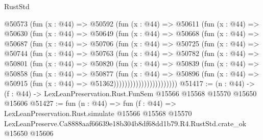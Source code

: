 \begin{lexlean}{RustStd}
\begin{coremodule}
          @50573
            (fun (x : @44) =>
            @50592
              (fun (x : @44) =>
              @50611
                (fun (x : @44) =>
                @50630
                  (fun (x : @44) =>
                  @50649
                    (fun (x : @44) =>
                    @50668
                      (fun (x : @44) =>
                      @50687
                        (fun (x : @44) =>
                        @50706
                          (fun (x : @44) =>
                          @50725
                            (fun (x : @44) =>
                            @50744
                              (fun (x : @44) =>
                              @50763
                                (fun (x : @44) =>
                                @50782
                                  (fun (x : @44) =>
                                  @50801
                                    (fun (x : @44) =>
                                    @50820
                                      (fun (x : @44) =>
                                      @50839
                                        (fun (x : @44) =>
                                        @50858
                                          (fun (x : @44) =>
                                          @50877
                                            (fun (x : @44) =>
                                            @50896
                                              (fun (x : @44) =>
                                              @50915 (fun (x : @44) => @51362)))))))))))))))))))))))
@51417 := (n : @44) ->
  (f : @44) -> LexLeanPreservation.Rust.FunSem @15566 @15568 @15570 @15650 @15606
@51427 := fun (n : @44) =>
  fun (f : @44) =>
  LexLeanPreservation.Rust.simulate
    @15566
    @15568
    @15570
    LexLeanPreserve.Ca8888aaf66639e18b304b8df68dd1b79.R4.RustStd.crate_ok
    @15650
    @15606
\end{coremodule}
\end{lexlean}
